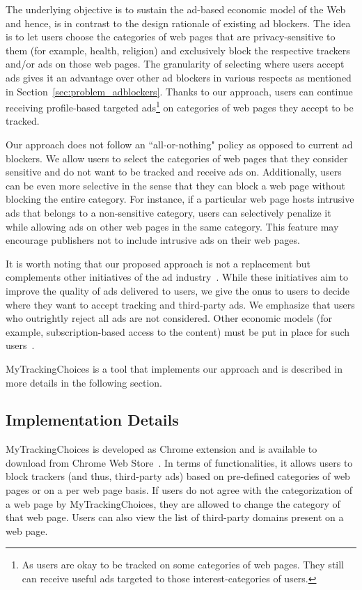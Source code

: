 \documentclass[conference]{IEEEtran}
\begin{document}
The underlying objective is to sustain the ad-based economic model of the Web and hence, is in contrast to the design rationale of existing ad blockers.
The idea is to let users choose the categories of web pages that are privacy-sensitive to them (for example, health, religion) and exclusively block the respective trackers and/or ads on those web pages.
The granularity of selecting where users accept ads gives it an advantage over other ad blockers in various respects as mentioned in Section~\ref{sec:problem_adblockers}.
Thanks to our approach, users can continue receiving profile-based targeted ads\footnote{As users are okay to be tracked on some categories of web pages. They still can receive useful ads targeted to those interest-categories of users.} 
on categories of web pages they accept to be tracked.


Our approach does not follow an ``all-or-nothing" policy as opposed to current ad blockers.
We allow users to select the categories of web pages that they consider sensitive and do not want to be tracked and receive ads on.
Additionally, users can be even more selective in the sense that they can block a web page without blocking the entire category.
For instance, if a particular web page hosts intrusive ads that belongs to a non-sensitive category, users can selectively penalize it while allowing ads on other web pages in the same category.
This feature may encourage publishers not to include intrusive ads on their web pages.


It is worth noting that our proposed approach is not a replacement but complements other initiatives of the ad industry~\cite{lean,acceptableads}.
While these initiatives aim to improve the quality of ads delivered to users, we give the onus to users to decide where they want to accept tracking and third-party ads. 
We emphasize that users who outrightly reject all ads are not considered.
Other economic models (for example, subscription-based access to the content) must be put in place for such users~\cite{Brave16Web}.

MyTrackingChoices is a tool that implements our approach and is described in more details in the following section.




\subsection{Implementation Details}
MyTrackingChoices is developed as Chrome extension and is available to download from Chrome Web Store~\cite{MtcChromeStoreUrl}.
In terms of functionalities, it allows users to block trackers (and thus, third-party ads) based on pre-defined categories of web pages or on a per web page basis.
If users do not agree with the categorization of a web page by MyTrackingChoices, they are allowed to change the category of that web page.
Users can also view the list of third-party domains present on a web page.
\end{document}
